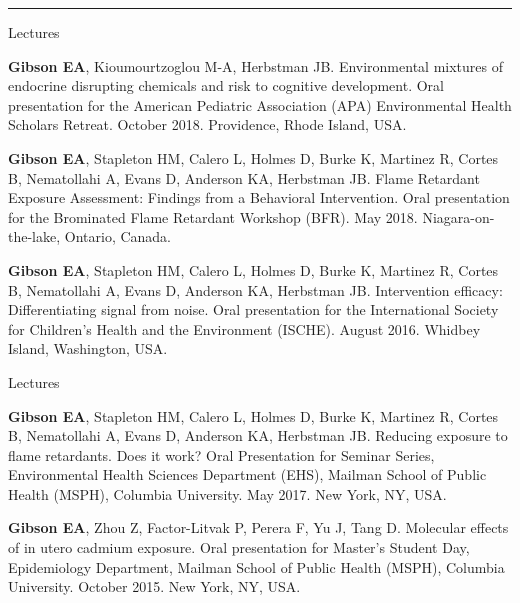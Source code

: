 \documentclass[a4paper,10pt]{article}
\newlength{\cvcolumngapwidth}
\newlength{\cvleftcolumnwidth}
\newlength{\cvrightcolumnwidth}
\newcommand{\cvsectionstyle}[1]{{\normalsize\cvsectionfont\textcolor{cvsectioncolor}{#1}}}
\newcommand{\cvdurationstyle}[1]{{\small\cvdurationfont\textcolor{cvdurationcolor}{#1}}}
\newlength{\cvafteritemskipamount}
\newlength{\cvaftersectionskipamount}
\newlength{\cvparskip}
\newcommand{\cvsection}[1]{
    \begin{minipage}[t]{\cvleftcolumnwidth}
        \raggedleft\cvsectionstyle{#1}
    \end{minipage}%
    \hspace{\cvcolumngapwidth}%
    \begin{minipage}[t]{\cvrightcolumnwidth}
        \textcolor{cvrulecolor}{\rule{\cvrightcolumnwidth}{0.3mm}}
    \end{minipage}

    \vspace{\cvaftersectionskipamount}
}
\newcommand{\cvitem}[2]{
    \begin{minipage}[t]{\cvleftcolumnwidth}
        \raggedleft #1
    \end{minipage}%
    \hspace{\cvcolumngapwidth}%
    \begin{minipage}[t]{\cvrightcolumnwidth}
        \setlength{\parskip}{\cvparskip} #2
    \end{minipage}

    \vspace{\cvafteritemskipamount}
}
\begin{document}
\cvsection{PRESENTATIONS}
\cvitem{
    \cvdurationstyle{Lectures}
}{  
    \begin{etaremune}
     \setcounter{enumi}{6}
	\item \textbf{Gibson EA}, Kioumourtzoglou M-A, Herbstman JB. Environmental mixtures of endocrine disrupting chemicals and risk to cognitive development. Oral presentation for the American Pediatric Association (APA) Environmental Health Scholars Retreat. October 2018. Providence, Rhode Island, USA.
	\item \textbf{Gibson EA}, Stapleton HM, Calero L, Holmes D, Burke K, Martinez R, Cortes B, Nematollahi A, Evans D, Anderson KA, Herbstman JB. Flame Retardant Exposure Assessment: Findings from a Behavioral Intervention. Oral presentation for the Brominated Flame Retardant Workshop (BFR). May 2018. Niagara-on-the-lake, Ontario, Canada. 
	\item \textbf{Gibson EA}, Stapleton HM, Calero L, Holmes D, Burke K, Martinez R, Cortes B, Nematollahi A, Evans D, Anderson KA, Herbstman JB. Intervention efficacy: Differentiating signal from noise. Oral presentation for the International Society for Children’s Health and the Environment (ISCHE). August 2016. Whidbey Island, Washington, USA.
\end{etaremune}
}

\cvitem{
    \cvdurationstyle{Lectures}
}{  
    \begin{etaremune}
	\item \textbf{Gibson EA}, Stapleton HM, Calero L, Holmes D, Burke K, Martinez R, Cortes B, Nematollahi A, Evans D, Anderson KA, Herbstman JB. Reducing exposure to flame retardants. Does it work? Oral Presentation for Seminar Series, Environmental Health Sciences Department (EHS), Mailman School of Public Health (MSPH), Columbia University. May 2017. New York, NY, USA.
	\item \textbf{Gibson EA}, Zhou Z, Factor-Litvak P, Perera F, Yu J, Tang D. Molecular effects of in utero cadmium exposure. Oral presentation for Master’s Student Day, Epidemiology Department, Mailman School of Public Health (MSPH), Columbia University. October 2015. New York, NY, USA.  
\end{etaremune}
}
\end{document}
